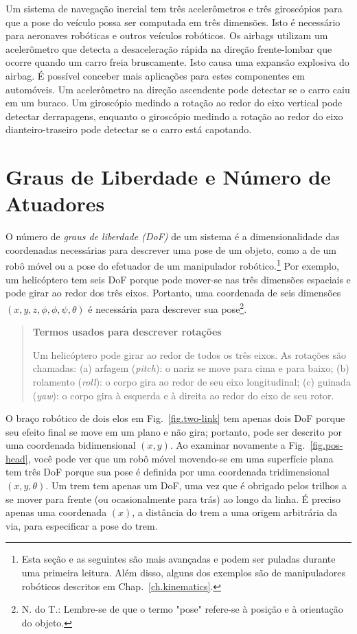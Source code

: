 Um sistema de navegação inercial tem três acelerômetros e três giroscópios para que a pose do veículo possa ser computada em três dimensões. Isto é necessário para aeronaves robóticas e outros veículos robóticos. Os airbags utilizam um acelerômetro que detecta a desaceleração rápida na direção frente-lombar que ocorre quando um carro freia bruscamente. Isto causa uma expansão explosiva do airbag. É possível conceber mais aplicações para estes componentes em automóveis. Um acelerômetro na direção ascendente pode detectar se o carro caiu em um buraco. Um giroscópio medindo a rotação ao redor do eixo vertical pode detectar derrapagens, enquanto o giroscópio medindo a rotação ao redor do eixo dianteiro-traseiro pode detectar se o carro está capotando.


\section{Graus de Liberdade e Número de Atuadores}\label{s.dof}

O número de \emph{graus de liberdade (DoF)} de um sistema é a dimensionalidade das coordenadas necessárias para descrever uma pose de um objeto, como a de um robô móvel ou a pose do efetuador de um manipulador robótico.\footnote{Esta seção e as seguintes são mais avançadas e podem ser puladas durante uma primeira leitura. Além disso, alguns dos exemplos são de manipuladores robóticos descritos em Chap.~\ref{ch.kinematics}.} Por exemplo, um helicóptero tem seis DoF porque pode mover-se nas três dimensões espaciais e pode girar ao redor dos três eixos. Portanto, uma coordenada de seis dimensões $(x,y,z,\phi,\phi,\psi,\theta)$ é necessária para descrever sua pose\footnote{N. do T.: Lembre-se de que o termo "pose" refere-se à posição e à orientação do objeto.}.

\begin{quote}
\begin{center}
\textbf{Termos usados para descrever rotações}
\end{center}
Um helicóptero pode girar ao redor de todos os três eixos. As rotações são chamadas: (a) arfagem (\emph{pitch}): o nariz se move para cima e para baixo; (b) rolamento (\emph{roll}): o corpo gira ao redor de seu eixo longitudinal; (c) guinada (\emph{yaw}): o corpo gira à esquerda e à direita ao redor do eixo de seu rotor.
\end{quote}

O braço robótico de dois elos em Fig.~\ref{fig.two-link} tem apenas dois DoF porque seu efeito final se move em um plano e não gira; portanto, pode ser descrito por uma coordenada bidimensional $(x,y)$. Ao examinar novamente a Fig.~\ref{fig.pos-head}, você pode ver que um robô móvel movendo-se em uma superfície plana tem três DoF porque sua pose é definida por uma coordenada tridimensional $(x,y,\theta)$. Um trem tem apenas um DoF, uma vez que é obrigado pelos trilhos a se mover para frente (ou ocasionalmente para trás) ao longo da linha. É preciso apenas uma coordenada $(x)$, a distância do trem a uma origem arbitrária da via, para especificar a pose do trem.

